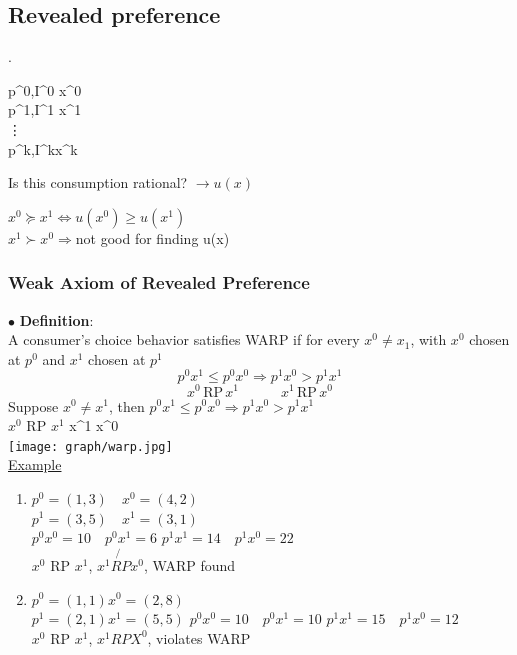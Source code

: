 \documentclass[letterpaper,13pt,single,pdftex]{scrartcl}
\newenvironment{rcases}
  {\left.\begin{aligned}}
  {\end{aligned}\right\rbrace}
\begin{document}
{\subsection{Revealed preference}

\begin{rcases}
      p^0,I^0 \rightarrow x^0\\
      p^1,I^1 \rightarrow x^1\\
      \vdots\\
      p^k,I^k\rightarrow x^k
\end{rcases} Is this consumption rational? $\rightarrow u(x)$

 $x^0 \succeq x^1 \Leftrightarrow u(x^0) \ge u(x^1) $\\ $x^1\succ x^0 \Rightarrow $not good for finding u(x)

\subsubsection{Weak Axiom of Revealed Preference}
$\bullet$ \textbf{Definition}: \\
A consumer's choice behavior satisfies WARP if for every $x^0 \ne x_1$, with $x^0$ chosen at $p^0$ and $x^1$ chosen at $p^1$
\[p^0x^1 \le p^0x^0 \Rightarrow p^1x^0 >p^1x^1\]
\[x^0 \,\text{RP} \, x^1 \qquad\quad x^1\, \text{RP} \,x^0\]
Suppose $x^0 \ne x^1$, then $p^0x^1 \le p^0x^0 \Rightarrow p^1x^0 >p^1x^1$\\$x^0$ RP $x^1$ \Rightarrow x^1  x^0\\
\texttt{[image: graph/warp.jpg]}\\
\underline{Example}
\begin{enumerate}
    \item 
    $p^0 = (1,3) \quad x^0 = (4,2)$\\ 
    $p^1 =(3, 5) \quad x^1 = (3,1)$\\
    $p^0x^0 = 10 \quad p^0x^1 = 6$\quad
    $p^1x^1 = 14 \quad p^1x^0 = 22$\\
    $x^0$ RP $x^1$, $x^1 \not{RP} x^0$, WARP found
    \item
     $p^0 = (1,1) x^0 = (2,8)$ \\ $p^1=(2,1) x^1 = (5,5)$
     $p^0x^0 = 10 \quad p^0x^1 = 10$ \quad $p^1x^1 = 15\quad p^1x^0 = 12$\\
     $x^0$ RP $x^1$, $x^1 RP X^0$, violates WARP\\
\end{enumerate}

}
\end{document}
